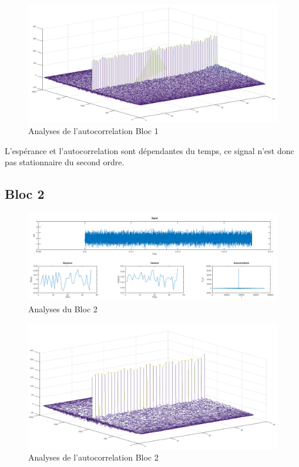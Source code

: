 \documentclass[french, a4paper, 12pt, openany]{book}
\begin{document}
	\begin{figure}[ht]
		\begin{center}
		\includegraphics[scale=0.25]{images/AutoCorrBloc1.png}
		\end{center}
		\caption{Analyses de l'autocorrelation Bloc 1}
		\label{Analyses de l'autocorrelation Bloc 1}
	\end{figure}

	L'espérance et l'autocorrelation sont dépendantes du temps, ce signal n'est donc pas stationnaire du second ordre.
  \subsection{Bloc 2}

	\begin{figure}[ht]
		\begin{center}
		\includegraphics[scale=0.25]{images/SignalBloc2.png}
		\end{center}
		\caption{Analyses du Bloc 2}
		\label{Analyses du Bloc 2}
	\end{figure}

	\begin{figure}[ht]
		\begin{center}
		\includegraphics[scale=0.25]{images/AutoCorrBloc2.png}
		\end{center}
		\caption{Analyses de l'autocorrelation Bloc 2}
		\label{Analyses de l'autocorrelation Bloc 2}
	\end{figure}
\end{document}
